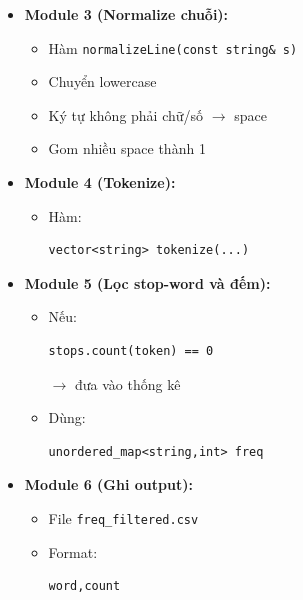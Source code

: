 \begin{itemize}
\begin{itemize}
\begin{itemize}
            \item Lưu stop-word vào:
\begin{lstlisting}
unordered_set<string> stops
\end{lstlisting}
        \end{itemize}

        \item \textbf{Module 3 (Normalize chuỗi):}

        \begin{itemize}
            \item Hàm \texttt{normalizeLine(const string\& s)}
            \item Chuyển lowercase
            \item Ký tự không phải chữ/số $\rightarrow$ space
            \item Gom nhiều space thành 1
        \end{itemize}

        \item \textbf{Module 4 (Tokenize):}

        \begin{itemize}
            \item Hàm:
\begin{lstlisting}
vector<string> tokenize(...)
\end{lstlisting}
        \end{itemize}

        \item \textbf{Module 5 (Lọc stop-word và đếm):}

        \begin{itemize}
            \item Nếu:
\begin{lstlisting}
stops.count(token) == 0
\end{lstlisting}

            $\rightarrow$ đưa vào thống kê

            \item Dùng:
\begin{lstlisting}
unordered_map<string,int> freq
\end{lstlisting}
        \end{itemize}

        \item \textbf{Module 6 (Ghi output):}

        \begin{itemize}
            \item File \texttt{freq\_filtered.csv}
            \item Format:
\begin{lstlisting}
word,count
\end{lstlisting}


\end{itemize}
\end{itemize}
\end{itemize}
